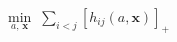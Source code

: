 \documentclass[preview]{standalone}
\begin{document}
\begin{align*}
\min_{a,\,\mathbf{x}}\; \sum_{i<j}[h_{ij}(a,\mathbf{x})]_+
\end{align*}
\end{document}
